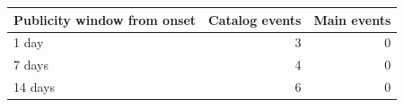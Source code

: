\begin{tabular}{lrr}
\toprule
Publicity window from onset & Catalog events & Main events \\
\midrule
1 day & 3 & 0 \\
7 days & 4 & 0 \\
14 days & 6 & 0 \\
\bottomrule
\end{tabular}
